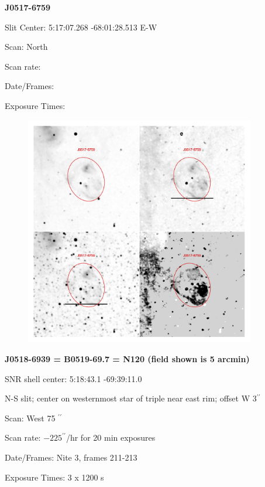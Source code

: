 \documentclass[11pt]{article}
\begin{document}
\newpage
{\bf J0517-6759}  
 
Slit Center:   5:17:07.268 -68:01:28.513    E-W 

Scan:  North

Scan rate:  

Date/Frames:

Exposure Times:  

\begin{figure}
\includegraphics[width=10.05cm]{snapshots/J0517-6759.png}
\end{figure}

\newpage
{\bf J0518-6939 = B0519-69.7 = N120  (field shown is 5 arcmin)}  
 
SNR shell center:   5:18:43.1  -69:39:11.0   

N-S slit; center on westernmost star of triple near east rim; offset W 3$^{\prime\prime}$

Scan:  West  75 $^{\prime\prime}$

Scan rate:  $-225 ^{\prime\prime}$/hr for 20 min exposures

Date/Frames:  Nite 3, frames 211-213

Exposure Times:  3 x 1200 s
\end{document}
